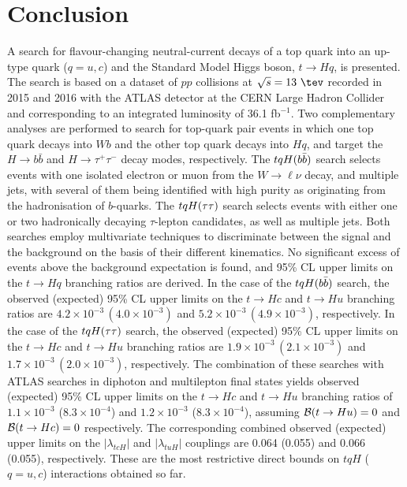 \section{Conclusion}
\label{sec:conclusion}

A search for flavour-changing neutral-current decays of a top quark into an up-type quark ($q=u, c$) and the Standard Model Higgs boson, $t\to Hq$, is presented. 
The search is based on a dataset of $pp$ collisions at $\sqrt{s}=13~\tev$ recorded in 2015 and 2016 with the ATLAS detector at the 
CERN Large Hadron Collider and corresponding to an integrated luminosity of 36.1 fb$^{-1}$.
Two complementary analyses are performed to search for top-quark pair events in which one top quark decays into $Wb$ and the other top quark decays into $Hq$,
and target the $H \to b\bar{b}$ and $H \to \tau^+\tau^-$  decay modes, respectively.  
The $tqH(b\bar{b})$ search selects events with one isolated electron or muon from the $W \to \ell\nu$ decay, and multiple jets, with several 
of them being identified with high purity as originating from the hadronisation of $b$-quarks. 
The $tqH(\tau\tau)$ search selects events with either one or two hadronically decaying $\tau$-lepton candidates, as well as multiple jets. 
Both searches employ multivariate techniques to discriminate between the signal and the background on the basis of their different kinematics. 
No significant excess of events above the background expectation is found, and 95\% CL upper limits on the $t\to Hq$ branching ratios are derived.
In the case of the $tqH(b\bar{b})$ search, the observed (expected) 95\% CL upper limits on the $t\to Hc$ and $t\to Hu$ branching ratios 
are $4.2 \times 10^{-3}\,(4.0 \times 10^{-3})$ and $5.2 \times 10^{-3}\,(4.9 \times 10^{-3})$, respectively.
In the case of the $tqH(\tau\tau)$ search, the observed (expected) 95\% CL upper limits on the $t\to Hc$ and $t\to Hu$ branching ratios 
are $1.9 \times 10^{-3}\,(2.1 \times 10^{-3})$ and $1.7 \times 10^{-3}\,(2.0 \times 10^{-3})$, respectively.
The combination of these searches with ATLAS searches in diphoton and multilepton final states 
yields observed (expected) 95\% CL upper limits on the $t\to Hc$ and $t\to Hu$ branching ratios of $1.1 \times 10^{-3}$ ($8.3 \times 10^{-4}$) 
and $1.2 \times 10^{-3}$ ($8.3 \times 10^{-4}$), assuming $\mathcal{B}(t\to Hu)=0$ and $\mathcal{B}(t\to Hc)=0$ respectively.
The corresponding combined observed (expected) upper limits on the $|\lambda_{tcH}|$ and $|\lambda_{tuH}|$ couplings are 0.064 (0.055) and 0.066 (0.055), respectively. 
These are the most restrictive direct bounds on $tqH$ ($q=u,c$) interactions obtained so far.
